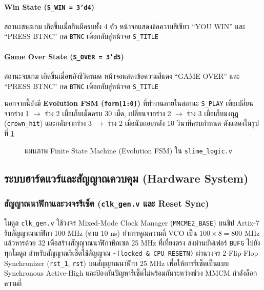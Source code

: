 \paragraph{Win State (\texttt{S\_WIN = 3'd4})}
สถานะชนะเกม เกิดขึ้นเมื่อกินผีครบทั้ง 4 ตัว หน้าจอแสดงข้อความสีเขียว “YOU WIN” และ “PRESS BTNC” กด \texttt{BTNC} เพื่อกลับสู่หน้าจอ \texttt{S\_TITLE}

\paragraph{Game Over State (\texttt{S\_OVER = 3'd5})}
สถานะจบเกม เกิดขึ้นเมื่อพลังชีวิตหมด หน้าจอแสดงข้อความสีแดง “GAME OVER” และ “PRESS BTNC” กด \texttt{BTNC} เพื่อกลับสู่หน้าจอ \texttt{S\_TITLE}

นอกจากนี้ยังมี \textbf{Evolution FSM (\texttt{form[1:0]})} ที่ทำงานภายในสถานะ \texttt{S\_PLAY} เพื่อเปลี่ยนจากร่าง 1 $\rightarrow$ ร่าง 2 เมื่อเก็บเม็ดครบ 30 เม็ด, เปลี่ยนจากร่าง 2 $\rightarrow$ ร่าง 3 เมื่อเก็บมงกุฎ (\texttt{crown\_hit}) และกลับจากร่าง 3 $\rightarrow$ ร่าง 2 เมื่อนับถอยหลัง 10 วินาทีครบกำหนด ดังแสดงในรูปที่ \ref{fig:evolution_fsm}

\begin{figure}[H]
    \centering
    \caption{แผนภาพ Finite State Machine (Evolution FSM) ใน \texttt{slime\_logic.v}}
    \label{fig:evolution_fsm}
\end{figure}

\subsection{ระบบฮาร์ดแวร์และสัญญาณควบคุม (Hardware System)}

\subsubsection{สัญญาณนาฬิกาและวงจรรีเซ็ต (\texttt{clk\_gen.v} และ Reset Sync)}

โมดูล \texttt{clk\_gen.v} ใช้วงจร Mixed-Mode Clock Manager (\texttt{MMCME2\_BASE}) บนชิป Artix-7 รับสัญญาณนาฬิกา 100 MHz (คาบ 10 ns) ทำการคูณความถี่ VCO เป็น $100 \times 8 = 800\text{ MHz}$ แล้วหารด้วย 32 เพื่อสร้างสัญญาณนาฬิกาพิกเซล 25 MHz ที่เที่ยงตรง ส่งผ่านบัฟเฟอร์ \texttt{BUFG} ไปยังทุกโมดูล สำหรับสัญญาณรีเซ็ตใช้สัญญาณ \texttt{\textasciitilde{}(locked \& CPU\_RESETN)} ผ่านวงจร 2-Flip-Flop Synchronizer (\texttt{rst\_1}, \texttt{rst}) บนสัญญาณนาฬิกา 25 MHz เพื่อให้การรีเซ็ตเป็นแบบ Synchronous Active-High และป้องกันปัญหารีเซ็ตไม่พร้อมกันระหว่างช่วง MMCM กำลังล็อกความถี่

